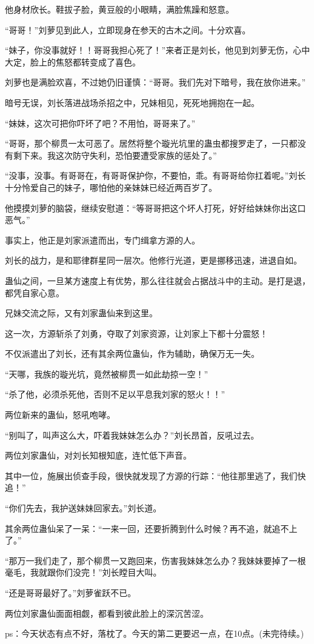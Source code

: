 \begin{this_body}
他身材欣长。鞋拔子脸，黄豆般的小眼睛，满脸焦躁和怒意。

“哥哥！”刘萝见到此人，立即现身在参天的古木之间。十分欢喜。

“妹子，你没事就好！！哥哥我担心死了！”来者正是刘长，他见到刘萝无伤，心中大定，脸上的焦怒都转变成了喜色。

刘萝也是满脸欢喜，不过她仍旧谨慎：“哥哥。我们先对下暗号，我在放你进来。”

暗号无误，刘长落进战场杀招之中，兄妹相见，死死地拥抱在一起。

“妹妹，这次可把你吓坏了吧？不用怕，哥哥来了。”

“哥哥，那个柳贯一太可恶了。居然将整个璇光坑里的蛊虫都搜罗走了，一只都没有剩下来。我这次防守失利，恐怕要遭受家族的惩处了。”

“没事，没事。有哥哥在，有哥哥保护你，不要怕，乖。有哥哥给你扛着呢。”刘长十分怜爱自己的妹子，哪怕他的亲妹妹已经近两百岁了。

他摸摸刘萝的脑袋，继续安慰道：“等哥哥把这个坏人打死，好好给妹妹你出这口恶气。”

事实上，他正是刘家派遣而出，专门缉拿方源的人。

刘长的战力，是和耶律群星同一层次。他修行光道，更是挪移迅速，进退自如。

蛊仙之间，一旦某方速度上有优势，那么往往就会占据战斗中的主动。是打是退，都凭自家心意。

兄妹交流之际，又有刘家蛊仙来到这里。

这一次，方源斩杀了刘勇，夺取了刘家资源，让刘家上下都十分震怒！

不仅派遣出了刘长，还有其余两位蛊仙，作为辅助，确保万无一失。

“天哪，我族的璇光坑，竟然被柳贯一如此劫掠一空！”

“杀了他，必须杀死他，否则不足以平息我刘家的怒火！！”

两位新来的蛊仙，怒吼咆哮。

“别叫了，叫声这么大，吓着我妹妹怎么办？”刘长昂首，反吼过去。

两位刘家蛊仙，对刘长知根知底，连忙低下声音。

其中一位，施展出侦查手段，很快就发现了方源的行踪：“他往那里逃了，我们快追！”

“你们先去，我护送妹妹回家去。”刘长道。

其余两位蛊仙呆了一呆：“一来一回，还要折腾到什么时候？再不追，就追不上了。”

“那万一我们走了，那个柳贯一又跑回来，伤害我妹妹怎么办？我妹妹要掉了一根毫毛，我就跟你们没完！”刘长瞠目大叫。

“还是哥哥最好了。”刘萝雀跃不已。

两位刘家蛊仙面面相觑，都看到彼此脸上的深沉苦涩。

ps：今天状态有点不好，落枕了。今天的第二更要迟一点，在10点。(未完待续。)

\end{this_body}


